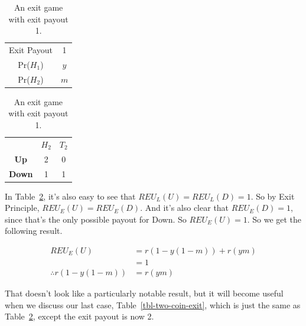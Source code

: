 \documentclass[
  12pt,
  letterpaper,
  DIV=11,
  numbers=noendperiod]{scrreprt}
\begin{document}
\begin{table}

\caption{\label{tbl-one-coin-exit}An exit game with exit payout
1.}\begin{minipage}[t]{0.50\linewidth}

{\centering 

\begin{tabular}[t]{cc}
\toprule
Exit Payout & 1\\
Pr(\(H_1\)) & \(y\)\\
Pr(\(H_2\)) & \(m\)\\
\bottomrule
\end{tabular}

}

\end{minipage}%
%
\begin{minipage}[t]{0.50\linewidth}

{\centering 

\begin{tabular}[t]{ccc}
\toprule
 & \(H_2\) & \(T_2\)\\
\textbf{Up} & 2 & 0\\
\textbf{Down} & 1 & 1\\
\bottomrule
\end{tabular}

}

\end{minipage}%

\end{table}

In Table~\ref{tbl-one-coin-exit}, it's also easy to see that
\(REU_L(U) = REU_L(D) = 1\). So by Exit Principle,
\(REU_E(U) = REU_E(D)\). And it's also clear that \(REU_E(D) = 1\),
since that's the only possible payout for Down. So \(REU_E(U) = 1\). So
we get the following result.

\begin{align*}
REU_E(U) &= r(1-y(1-m)) + r(ym) \\
 &= 1    \\
\therefore  r(1-y(1-m)) &= r(ym)
\end{align*}

That doesn't look like a particularly notable result, but it will become
useful when we discuss our last case, Table~\ref{tbl-two-coin-exit},
which is just the same as Table~\ref{tbl-one-coin-exit}, except the exit
payout is now 2.
\end{document}
